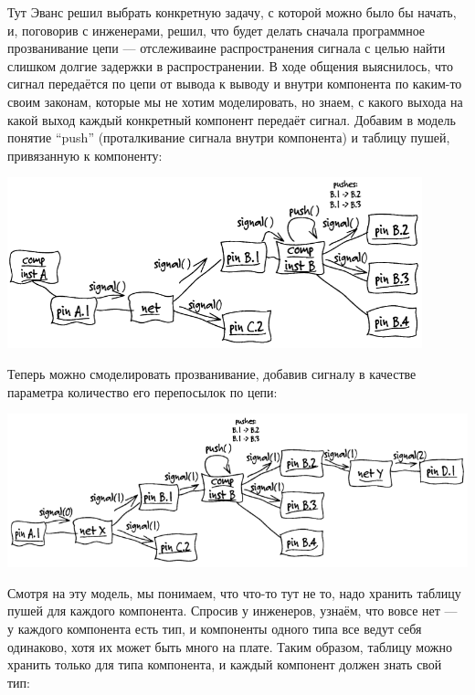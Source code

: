 \documentclass[a5paper]{article}
\begin{document}
Тут Эванс решил выбрать конкретную задачу, с которой можно было бы начать, и, поговорив с инженерами, решил, что будет делать сначала программное прозванивание цепи --- отслеживаине распространения сигнала с целью найти слишком долгие задержки в распространении. В ходе общения выяснилось, что сигнал передаётся по цепи от вывода к выводу и внутри компонента по каким-то своим законам, которые мы не хотим моделировать, но знаем, с какого выхода на какой выход каждый конкретный компонент передаёт сигнал. Добавим в модель понятие ``push'' (проталкивание сигнала внутри компонента) и таблицу пушей, привязанную к компоненту:

\begin{center}
	\includegraphics[width=0.9\textwidth]{signals.png}
\end{center}

Теперь можно смоделировать прозванивание, добавив сигналу в качестве параметра количество его перепосылок по цепи:

\begin{center}
	\includegraphics[width=\textwidth]{probeSimulation.png}
\end{center}

Смотря на эту модель, мы понимаем, что что-то тут не то, надо хранить таблицу пушей для каждого компонента. Спросив у инженеров, узнаём, что вовсе нет --- у каждого компонента есть тип, и компоненты одного типа все ведут себя одинаково, хотя их может быть много на плате. Таким образом, таблицу можно хранить только для типа компонента, и каждый компонент должен знать свой тип:
\end{document}
